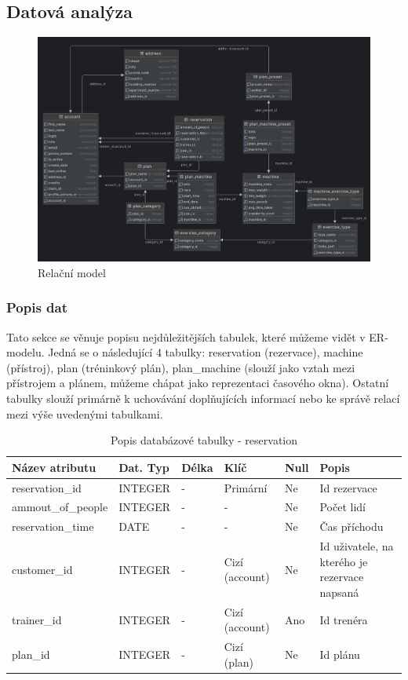 \subsection{Datová analýza}

\begin{figure}[ht]
	\includegraphics[width=1\textwidth]{Figures/ermodel.png}
	\caption{ Relační model}
	\label{fig:RelationalModel}
\end{figure}

\subsubsection{Popis dat}
Tato sekce se věnuje popisu nejdůležitějších tabulek, které můžeme vidět v ER-modelu. Jedná se o následující 4 tabulky: reservation (rezervace), machine (přístroj), plan (tréninkový plán), plan\_machine (slouží jako vztah mezi přístrojem a plánem, můžeme chápat jako reprezentaci časového okna). Ostatní tabulky slouží primárně k uchovávání doplňujících informací nebo ke správě relací mezi výše uvedenými tabulkami.

\begin{table}[ht]
	\caption{Popis databázové tabulky - reservation}
    \label{tab:dat-dictionary-reservation}
	\begin{tabular}{|p{3.5cm}|p{2cm}|p{1cm}|p{2.5cm}|p{.75cm}|p{3.75cm}|}
		\hline
        \textbf{Název atributu} & \textbf{Dat. Typ} & \textbf{Délka} & \textbf{Klíč} & \textbf{Null} & \textbf{Popis} \\
        \hline
        reservation\_id & INTEGER & - & Primární & Ne & Id rezervace \\
        \hline
        ammout\_of\_people & INTEGER & - & - & Ne & Počet lidí \\
        \hline
        reservation\_time & DATE & - & - & Ne & Čas příchodu \\
        \hline
        customer\_id & INTEGER & - & Cizí (account) & Ne & Id uživatele, na kterého je rezervace napsaná \\
        \hline
        trainer\_id & INTEGER & - & Cizí (account) & Ano & Id trenéra \\
        \hline
        plan\_id & INTEGER & - & Cizí (plan) & Ne & Id plánu \\
        \hline
	\end{tabular}
\end{table}

